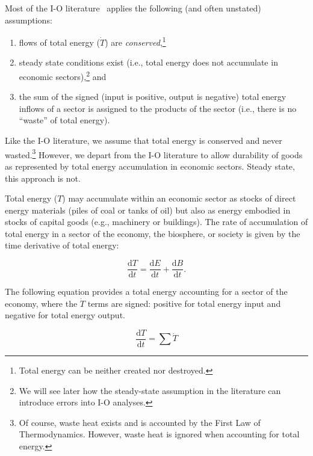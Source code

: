 Most of the I-O literature~\cite{Bullard1975, Herendeen1978} 
applies the following (and often unstated) assumptions:

\begin{enumerate}
	\item flows of total energy ($\dot{T}$) are 
	\emph{conserved},\footnote{Total energy 
	can be neither created nor destroyed.}

	\item steady state conditions exist 
	(i.e., total energy does not accumulate in economic 
	sectors),\footnote{We will see later how the
	steady-state assumption in the literature 
	can introduce errors into I-O analyses.} and
	
	\item the sum of the signed 
	(input is positive, output is negative) 
	total energy inflows of a sector
	is assigned to the products of the sector (i.e., 
	there is no ``waste'' of total energy).
\end{enumerate}

Like the I-O literature, we assume that total energy is conserved
and never wasted.\footnote{Of course, waste heat exists and is
accounted by the First Law of Thermodynamics. However,
waste heat is ignored when accounting for total energy.}
However, we depart from the I-O literature to allow durability of goods 
as represented by total energy accumulation in economic sectors. 
Steady state, this approach is not. 

Total energy ($T$) may accumulate within an economic sector 
as stocks of direct energy materials 
(piles of coal or tanks of oil) 
but also as energy embodied in stocks of capital goods 
(e.g., machinery or buildings). 
The rate of accumulation of total energy 
in a sector of the economy, the biosphere, 
or society is given by the time derivative of total energy:

\begin{equation} \label{eq:T_accum_def}
	\frac{\mathrm{d}T}{\mathrm{d}t} 
	= \frac{\mathrm{d}E}{\mathrm{d}t} 
	+ \frac{\mathrm{d}B}{\mathrm{d}t}.
\end{equation}

The following equation provides a total energy accounting 
for a sector of the economy, where the $\dot{T}$ terms
are signed: positive for total energy input and negative
for total energy output.

\begin{equation} \label{eq:total_energy_accounting}
		\frac{\mathrm{d}T}{\mathrm{d}t}
		= \sum \dot{T}
\end{equation}

